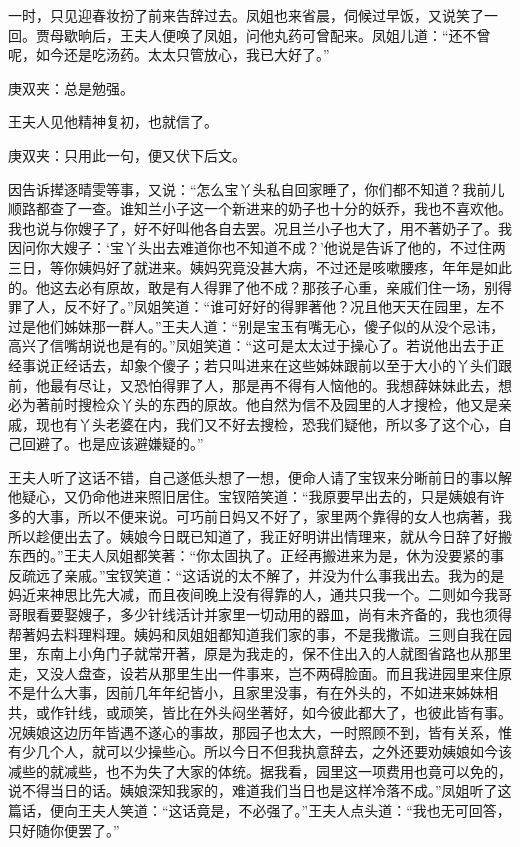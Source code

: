 \begin{parag}
    一时，只见迎春妆扮了前来告辞过去。凤姐也来省晨，伺候过早饭，又说笑了一回。贾母歇晌后，王夫人便唤了凤姐，问他丸药可曾配来。凤姐儿道：“还不曾呢，如今还是吃汤药。太太只管放心，我已大好了。”\begin{note}庚双夹：总是勉强。\end{note}王夫人见他精神复初，也就信了。\begin{note}庚双夹：只用此一句，便又伏下后文。\end{note}因告诉撵逐晴雯等事，又说：“怎么宝丫头私自回家睡了，你们都不知道？我前儿顺路都查了一查。谁知兰小子这一个新进来的奶子也十分的妖乔，我也不喜欢他。我也说与你嫂子了，好不好叫他各自去罢。况且兰小子也大了，用不著奶子了。我因问你大嫂子：‘宝丫头出去难道你也不知道不成？’他说是告诉了他的，不过住两三日，等你姨妈好了就进来。姨妈究竟没甚大病，不过还是咳嗽腰疼，年年是如此的。他这去必有原故，敢是有人得罪了他不成？那孩子心重，亲戚们住一场，别得罪了人，反不好了。”凤姐笑道：“谁可好好的得罪著他？况且他天天在园里，左不过是他们姊妹那一群人。”王夫人道：“别是宝玉有嘴无心，傻子似的从没个忌讳，高兴了信嘴胡说也是有的。”凤姐笑道：“这可是太太过于操心了。若说他出去于正经事说正经话去，却象个傻子；若只叫进来在这些姊妹跟前以至于大小的丫头们跟前，他最有尽让，又恐怕得罪了人，那是再不得有人恼他的。我想薛妹妹此去，想必为著前时搜检众丫头的东西的原故。他自然为信不及园里的人才搜检，他又是亲戚，现也有丫头老婆在内，我们又不好去搜检，恐我们疑他，所以多了这个心，自己回避了。也是应该避嫌疑的。”
\end{parag}


\begin{parag}
    王夫人听了这话不错，自己遂低头想了一想，便命人请了宝钗来分晰前日的事以解他疑心，又仍命他进来照旧居住。宝钗陪笑道：“我原要早出去的，只是姨娘有许多的大事，所以不便来说。可巧前日妈又不好了，家里两个靠得的女人也病著，我所以趁便出去了。姨娘今日既已知道了，我正好明讲出情理来，就从今日辞了好搬东西的。”王夫人凤姐都笑著：“你太固执了。正经再搬进来为是，休为没要紧的事反疏远了亲戚。”宝钗笑道：“这话说的太不解了，并没为什么事我出去。我为的是妈近来神思比先大减，而且夜间晚上没有得靠的人，通共只我一个。二则如今我哥哥眼看要娶嫂子，多少针线活计并家里一切动用的器皿，尚有未齐备的，我也须得帮著妈去料理料理。姨妈和凤姐姐都知道我们家的事，不是我撒谎。三则自我在园里，东南上小角门子就常开著，原是为我走的，保不住出入的人就图省路也从那里走，又没人盘查，设若从那里生出一件事来，岂不两碍脸面。而且我进园里来住原不是什么大事，因前几年年纪皆小，且家里没事，有在外头的，不如进来姊妹相共，或作针线，或顽笑，皆比在外头闷坐著好，如今彼此都大了，也彼此皆有事。况姨娘这边历年皆遇不遂心的事故，那园子也太大，一时照顾不到，皆有关系，惟有少几个人，就可以少操些心。所以今日不但我执意辞去，之外还要劝姨娘如今该减些的就减些，也不为失了大家的体统。据我看，园里这一项费用也竟可以免的，说不得当日的话。姨娘深知我家的，难道我们当日也是这样冷落不成。”凤姐听了这篇话，便向王夫人笑道：“这话竟是，不必强了。”王夫人点头道：“我也无可回答，只好随你便罢了。”
\end{parag}


